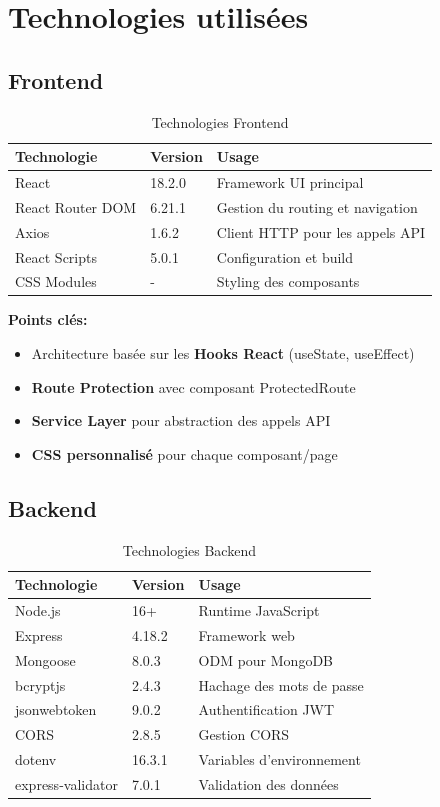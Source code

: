 \documentclass[12pt,a4paper]{article}
\begin{document}
\section{Technologies utilisées}

\subsection{Frontend}

\begin{table}[h]
\centering
\begin{tabular}{|l|l|p{6cm}|}
\hline
\textbf{Technologie} & \textbf{Version} & \textbf{Usage} \\
\hline
React & 18.2.0 & Framework UI principal \\
React Router DOM & 6.21.1 & Gestion du routing et navigation \\
Axios & 1.6.2 & Client HTTP pour les appels API \\
React Scripts & 5.0.1 & Configuration et build \\
CSS Modules & - & Styling des composants \\
\hline
\end{tabular}
\caption{Technologies Frontend}
\end{table}

\textbf{Points clés:}
\begin{itemize}
    \item Architecture basée sur les \textbf{Hooks React} (useState, useEffect)
    \item \textbf{Route Protection} avec composant ProtectedRoute
    \item \textbf{Service Layer} pour abstraction des appels API
    \item \textbf{CSS personnalisé} pour chaque composant/page
\end{itemize}

\subsection{Backend}

\begin{table}[h]
\centering
\begin{tabular}{|l|l|p{6cm}|}
\hline
\textbf{Technologie} & \textbf{Version} & \textbf{Usage} \\
\hline
Node.js & 16+ & Runtime JavaScript \\
Express & 4.18.2 & Framework web \\
Mongoose & 8.0.3 & ODM pour MongoDB \\
bcryptjs & 2.4.3 & Hachage des mots de passe \\
jsonwebtoken & 9.0.2 & Authentification JWT \\
CORS & 2.8.5 & Gestion CORS \\
dotenv & 16.3.1 & Variables d'environnement \\
express-validator & 7.0.1 & Validation des données \\
\hline
\end{tabular}
\caption{Technologies Backend}
\end{table}
\end{document}
